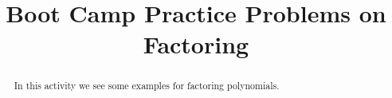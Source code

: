 \documentclass{ximera}
\title{Boot Camp Practice Problems on Factoring}
\begin{document}
\begin{abstract}
In this activity we see some examples for factoring polynomials.
\end{abstract}
\maketitle


\begin{shuffle} %


\end{shuffle}
\end{document}
